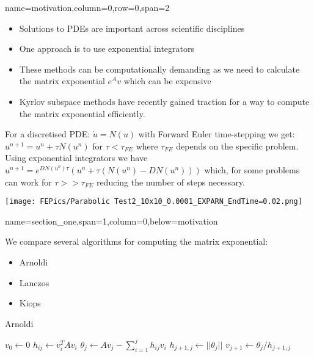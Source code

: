 \documentclass[latin,a0paper,portrait]{xebaposter}
\begin{document}
\begin{poster}
{name=motivation,column=0,row=0,span=2}
{
\begin{multicols}{2}
\begin{itemize}
\item Solutions to PDEs are important across scientific disciplines 
\item One approach is to use exponential integrators
\item These methods can be computationally demanding as we need to calculate the matrix exponential $e^Av$ which can be expensive
\item Kyrlov subspace methods have recently gained traction for a way to compute the matrix exponential efficiently\cite{Moler2003}.
\end{itemize}
For a discretised PDE: $\dot u = N(u)$ with Forward Euler time-stepping we get: $u^{n+1} = u^n+\tau N(u^n)$ for $\tau < \tau_{FE}$ where $\tau_{FE}$ depends on the specific problem. Using exponential integrators we have $u^{n+1} = e^{DN(u^n)\tau}(u^n + \tau(N(u^n)-DN(u^n)))$ which, for some problems can work for $\tau >> \tau_{FE}$ reducing the number of steps necessary.
\columnbreak

\begin{center}
    \texttt{[image: FEPics/Parabolic Test2\_10x10\_0.0001\_EXPARN\_EndTime=0.02.png]}
    \label{fig:example_a}
\end{center}

\end{multicols}
}


{name=section_one,span=1,column=0,below=motivation}
{
We compare several algorithms for computing the matrix exponential:
\begin{itemize}
\item Arnoldi
\item Lanczos \cite{OJALVO1970}
\item Kiops \cite{Gaudreault2018}
\end{itemize}
\begin{center}
\begin{algorithm}[H]
\caption{Arnoldi \cite{Fan2018}} %
\begin{algorithmic}
\State $v_0 \gets 0$
\State$h_{ij} \gets v_i^T A v_i$
\EndFor
\State$\theta_j \gets Av_j - \sum^j_{i=1} h_{ij}v_i$
\State$h_{j+1,j} \gets ||\theta_j||$
\State$v_{j+1} \gets \theta_j/h_{j+1,j}$
\EndFor
\EndProcedure
\end{algorithmic}
\end{algorithm}
\end{center}
}


\end{poster}
\end{document}
